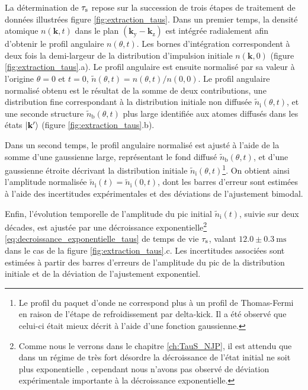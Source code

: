La détermination de $\tau_{\mathrm{s}}$ repose sur la succession de trois étapes de traitement de données illustrées figure \ref{fig:extraction_taus}. Dans un premier temps, la densité atomique $n(\mathbf{k},t)$ dans le plan $(\mathbf{k}_{\mathrm{y}}-\mathbf{k}_{\mathrm{z}})$ est intégrée radialement afin d'obtenir le profil angulaire $n(\theta,t)$. Les bornes d'intégration correspondent  à deux fois la demi-largeur de la distribution d'impulsion initiale $n(\mathbf{k},0)$ (figure \ref{fig:extraction_taus}.a). Le profil angulaire est ensuite normalisé par sa valeur à l'origine $\theta=0$ et $t=0$, $\tilde{n}(\theta,t)= n(\theta,t)/n(0,0)$. Le profil angulaire normalisé obtenu est le résultat de la somme de deux contributions, une distribution fine correspondant à la distribution initiale non diffusée $\tilde{n}_{\mathrm{i}}(\theta,t)$, et une seconde structure $\tilde{n}_{\mathrm{b}}(\theta,t)$ plus large identifiée aux atomes diffusés dans les états $\left| \mathbf{k}' \right\rangle$ (figure \ref{fig:extraction_taus}.b). 

Dans un second temps, le profil angulaire normalisé est ajusté à l'aide de la somme d'une gaussienne large, représentant le fond diffusé $\tilde{n}_{\mathrm{b}}(\theta,t)$, et d'une gaussienne étroite décrivant la distribution initiale $\tilde{n}_{\mathrm{i}}(\theta,t)$\footnote{Le profil du paquet d'onde ne correspond plus à un profil de Thomas-Fermi en raison de l'étape de refroidissement par delta-kick. Il a été observé que celui-ci était mieux décrit à l'aide d'une fonction gaussienne.}. On obtient ainsi l'amplitude normalisée $\tilde{n}_{\mathrm{i}}(t)=\tilde{n}_{\mathrm{i}}(0,t)$, dont les barres d'erreur sont estimées à l'aide des incertitudes expérimentales et des déviations de l'ajustement bimodal. 

Enfin, l'évolution temporelle de l'amplitude du pic initial $\tilde{n}_{\mathrm{i}}(t)$, suivie sur deux décades, est ajustée par une décroissance exponentielle\footnote{Comme nous le verrons dans le chapitre \ref{ch:TauS_NJP}, il est attendu que dans un régime de très fort désordre la décroissance de l'état initial ne soit plus exponentielle \citep{trappe2015semiclassical}, cependant nous n'avons pas observé de déviation expérimentale importante à la décroissance exponentielle.} \ref{eq:decroissance_exponentielle_taus} de temps de vie $\tau_{\mathrm{s}}$, valant $12.0\pm\SI{0.3}{\milli\second}$ dans le cas de la figure \ref{fig:extraction_taus}.c. Les incertitudes associées sont estimées à partir des barres d'erreurs de l'amplitude du pic de la distribution initiale et de la déviation de l'ajustement exponentiel. 




